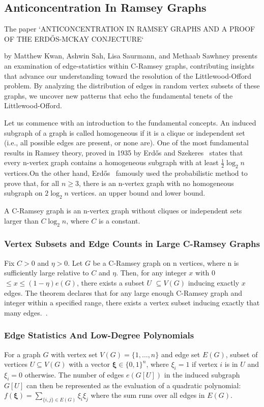 
\subsection{Anticoncentration In Ramsey Graphs}\label{sec:anticoncentration}
The paper `ANTICONCENTRATION IN RAMSEY GRAPHS AND A PROOF OF THE
ERDŐS-MCKAY CONJECTURE`~\cite{kwan2022anticoncentration}

by Matthew Kwan, Ashwin Sah, Lisa Saurmann, and Methaab Sawhney
presents an examination of edge-statistics within C-Ramsey graphs,
contributing insights that advance our understanding toward
the resolution of the Littlewood-Offord problem. 
By analyzing the distribution of edges in random vertex subsets of these graphs,
we uncover new patterns that echo the fundamental tenets of the 
Littlewood-Offord.

Let us commence with an introduction to the fundamental concepts.
An induced subgraph of a graph is called homogeneous 
if it is a clique or independent set (i.e., all possible edges are present, or none are).
One of the most fundamental results in Ramsey theory,
proved in 1935 by Erdős and Szekeres~\cite{erdos1935combinatorial}  states that every 
n-vertex graph contains a homogeneous subgraph with
at least $ \frac{1}{2} \log_2{n} $ vertices.On the other hand, Erdős~\cite{erdos1947some} famously used
the probabilistic method to prove that, for all $n \geq 3$, there is an n-vertex graph
with no homogeneous subgraph on $2 \log_2{n}$ vertices. an upper bound and lower bound.

A C-Ramsey graph is an n-vertex graph without cliques or independent sets 
larger than \(C \log_2 n\), where \(C\) is a constant.


\subsubsection{Vertex Subsets and Edge Counts in Large C-Ramsey Graphs} Fix  $C > 0$  and $ \eta > 0$. Let  $G$  be a  C-Ramsey graph on  n  vertices,
where  n  is sufficiently large relative to  $C$  and  $\eta$. Then, for any integer  $x$  with
0 $\leq x \leq (1 - \eta)e(G)$,  there exists a subset  $U$ $\subseteq V(G)$  inducing exactly 
$x$  edges.
The theorem declares that for any large enough C-Ramsey
graph and integer within a specified range, there exists a vertex
subset inducing exactly that many edges.~\cite{alon2003induced}.


\subsubsection{Edge Statistics And Low-Degree Polynomials}
For a graph $G$ with vertex set $V(G) = \{1, \ldots, n\}$ and edge set $E(G)$,
subset of vertices $U \subseteq V(G)$ with a vector
$\mathbf{\xi} \in \{0,1\}^n$, where $\xi_i = 1$ if vertex $i$ is in $U$ and $\xi_i = 0$ otherwise.
The number of edges $e(G[U])$ in the induced subgraph $G[U]$ can then be represented
as the evaluation of a quadratic polynomial: $f(\mathbf{\xi}) = \sum_{\{i,j\} \in E(G)} \xi_i \xi_j$
where the sum runs over all edges in $E(G)$. 

